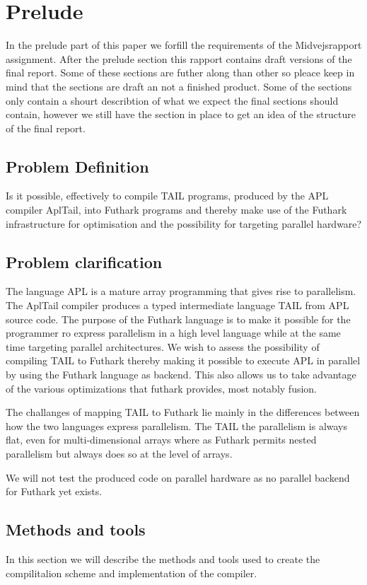 \documentclass[11pt]{article}
\begin{document}
\section{Prelude}

In the prelude part of this paper we forfill the requirements of the Midvejsrapport assignment. After the prelude section this rapport contains draft versions of the final report. Some of these sections are futher along than other so pleace keep in mind that the sections are draft an not a finished product. Some of the sections only contain a shourt describtion of what we expect the final sections should contain, however we still have the section in place to get an idea of the structure of the final report.  

\subsection{Problem Definition}
Is it possible, effectively to compile TAIL programs, produced by the APL compiler AplTail,
into Futhark programs and thereby make use of the Futhark infrastructure for optimisation
and the possibility for targeting parallel hardware?

\subsection{Problem clarification}
The language APL is a mature array programming that gives rise to parallelism. The AplTail compiler produces
a typed intermediate language TAIL from APL source code. The purpose of the Futhark language is to make it possible for the programmer ro express parallelism in a high level language while at the same time targeting parallel architectures.
We wish to assess the possibility of compiling TAIL to Futhark thereby making it possible to execute APL in parallel by using the Futhark language as backend. This also allows us to take advantage of the various optimizations that futhark provides, most notably fusion.

The challanges of mapping TAIL to Futhark lie mainly in the differences between how the two languages express parallelism.
The TAIL the parallelism is always flat, even for multi-dimensional arrays where as Futhark permits nested parallelism but always
does so at the level of arrays.

We will not test the produced code on parallel hardware as no parallel backend for Futhark yet exists.

\subsection{Methods and tools}
In this section we will describe the methods and tools used to create the compilitalion scheme and implementation of the compiler. 
\end{document}
